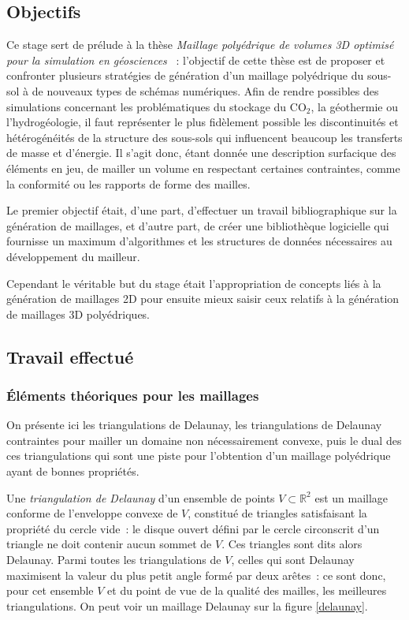 \documentclass[12pt,a4paper]{report}
\begin{document}
\subsection{Objectifs}

Ce stage sert de prélude à la thèse \og \emph{Maillage polyédrique de volumes 3D optimisé pour la simulation en géosciences} \fg{}~: l'objectif de cette thèse est de proposer et confronter plusieurs stratégies de génération d'un maillage polyédrique du sous-sol à de nouveaux types de schémas numériques. Afin de rendre possibles des simulations concernant les problématiques du stockage du CO$_2$, la géothermie ou l'hydrogéologie, il faut représenter le plus fidèlement possible les discontinuités et hétérogénéités de la structure des sous-sols qui influencent beaucoup les transferts de masse et d'énergie. Il s'agit donc, étant donnée une description surfacique des éléments en jeu, de mailler un volume en respectant certaines contraintes, comme la conformité ou les rapports de forme des mailles.

Le premier objectif était, d'une part, d'effectuer un travail bibliographique sur la génération de maillages, et d'autre part, de créer une bibliothèque logicielle qui fournisse un maximum d'algorithmes et les structures de données nécessaires au développement du mailleur.

Cependant le véritable but du stage était l'appropriation de concepts liés à la génération de maillages 2D pour ensuite mieux saisir ceux relatifs à la génération de maillages 3D polyédriques.

\subsection{Travail effectué}

\subsubsection{\'Eléments théoriques pour les maillages}

On présente ici les triangulations de Delaunay, les triangulations de Delaunay contraintes pour mailler un domaine non nécessairement convexe, puis le dual des ces triangulations qui sont une piste pour l'obtention d'un maillage polyédrique ayant de bonnes propriétés.
\vspace{1cm}

Une \emph{triangulation de Delaunay} d'un ensemble de points $V\subset\mathbb{R}^2$ est un maillage conforme de l'enveloppe convexe de $V$, constitué de triangles satisfaisant la propriété du cercle vide~: le disque ouvert défini par le cercle circonscrit d'un triangle ne doit contenir aucun sommet de $V$. Ces triangles sont dits alors Delaunay. Parmi toutes les triangulations de $V$, celles qui sont Delaunay maximisent la valeur du plus petit angle formé par deux arêtes~: ce sont donc, pour cet ensemble $V$ et du point de vue de la qualité des mailles, les \og meilleures \fg{} triangulations. On peut voir un maillage Delaunay sur la figure \ref{delaunay}.
\end{document}
